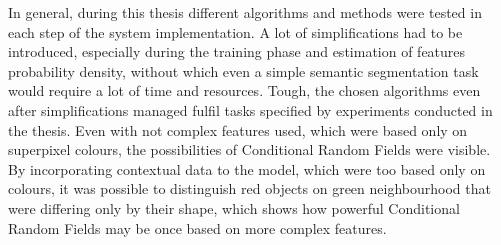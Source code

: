 In general, during this thesis different algorithms and methods were tested in each step of the system implementation. A lot of simplifications had to be introduced, especially during the training phase and estimation of features probability density, without which even a simple semantic segmentation task would require a lot of time and resources. Tough, the chosen algorithms even after simplifications managed fulfil tasks specified by experiments conducted in the thesis. Even with not complex features used, which were based only on superpixel colours, the possibilities of Conditional Random Fields were visible. By incorporating contextual data to the model, which were too based only on colours, it was possible to distinguish red objects on green neighbourhood that were differing only by their shape, which shows how powerful Conditional Random Fields may be once based on more complex features.
